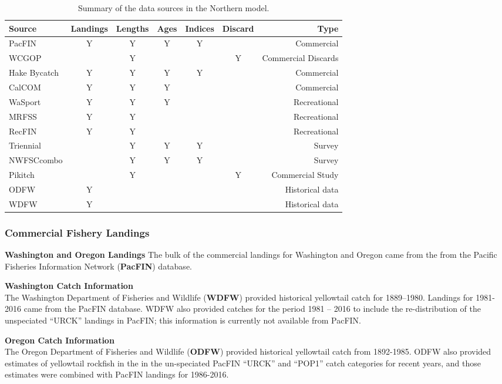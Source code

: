 \documentclass[12pt,]{article}
\begin{document}
\begin{table}[ht]
\centering
\caption{Summary of the data sources in the Northern model.} 
\label{tab:Data_sources}
\begin{tabular}{lcccccr}
  \hline
Source & Landings & Lengths & Ages & Indices & Discard & Type \\ 
  \hline
PacFIN & Y & Y & Y & Y &  & Commercial \\ 
  WCGOP &  & Y &  &  & Y & Commercial Discards \\ 
  Hake Bycatch & Y & Y & Y & Y &  & Commercial \\ 
  CalCOM & Y & Y & Y &  &  & Commercial \\ 
  WaSport & Y & Y & Y &  &  & Recreational \\ 
  MRFSS & Y & Y &  &  &  & Recreational \\ 
  RecFIN & Y & Y &  &  &  & Recreational \\ 
  Triennial &  & Y & Y & Y &  & Survey \\ 
  NWFSCcombo &  & Y & Y & Y &  & Survey \\ 
  Pikitch &  & Y &  &  & Y & Commercial Study \\ 
  ODFW & Y &  &  &  &  & Historical data \\ 
  WDFW & Y &  &  &  &  & Historical data \\ 
   \hline
\end{tabular}
\end{table}

\subsubsection{Commercial Fishery
Landings}\label{commercial-fishery-landings}

\textbf{Washington and Oregon Landings} The bulk of the commercial
landings for Washington and Oregon came from the from the Pacific
Fisheries Information Network (\textbf{PacFIN}) database.

\textbf{Washington Catch Information}\\
The Washington Department of Fisheries and Wildlife (\textbf{WDFW})
provided historical yellowtail catch for 1889--1980. Landings for
1981-2016 came from the PacFIN database. WDFW also provided catches for
the period 1981 -- 2016 to include the re-distribution of the
unspeciated ``URCK'' landings in PacFIN; this information is currently
not available from PacFIN.

\textbf{Oregon Catch Information}\\
The Oregon Department of Fisheries and Wildlife (\textbf{ODFW}) provided
historical yellowtail catch from 1892-1985. ODFW also provided estimates
of yellowtail rockfish in the in the un-speciated PacFIN ``URCK'' and
``POP1'' catch categories for recent years, and those estimates were
combined with PacFIN landings for 1986-2016.
\end{document}
